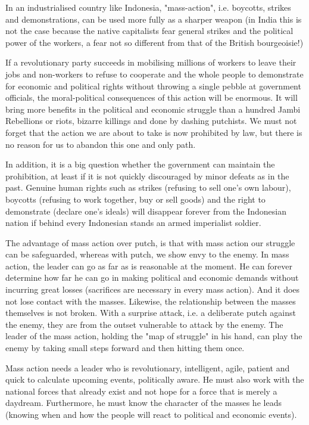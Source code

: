 In an industrialised country like Indonesia, "mass-action", i.e. boycotts, strikes and demonstrations, can be used more fully as a 
sharper weapon (in India this is not the case because the native capitalists fear general strikes and the political power of the workers, 
a fear not so different from that of the British bourgeoisie!)\nline

If a revolutionary party succeeds in mobilising millions of workers to leave their jobs and non-workers to refuse to cooperate and the 
whole people to demonstrate for economic and political rights without throwing a single pebble at government officials, the moral-political 
consequences of this action will be enormous. It will bring more benefits in the political and economic struggle than a hundred Jambi 
Rebellions or riots, bizarre killings and done by dashing putchists. We must not forget that the action we are about to take is now 
prohibited by law, but there is no reason for us to abandon this one and only path.\nline

In addition, it is a big question whether the government can maintain the prohibition, at least if it is not quickly discouraged by minor 
defeats as in the past. Genuine human rights such as strikes (refusing to sell one's own labour), boycotts (refusing to work together, 
buy or sell goods) and the right to demonstrate (declare one's ideals) will disappear forever from the Indonesian nation if behind every 
Indonesian stands an armed imperialist soldier.\nline

The advantage of mass action over putch, is that with mass action our struggle can be safeguarded, whereas with putch, 
we show envy to the enemy. In mass action, the leader can go as far as is reasonable at the moment. He can forever determine how far he 
can go in making political and economic demands without incurring great losses (sacrifices are necessary in every mass action). And it 
does not lose contact with the masses. Likewise, the relationship between the masses themselves is not broken. With a surprise attack, 
i.e. a deliberate putch against the enemy, they are from the outset vulnerable to attack by the enemy. The leader of the mass action, 
holding the "map of struggle" in his hand, can play the enemy by taking small steps forward and then hitting them once.\nline

Mass action needs a leader who is revolutionary, intelligent, agile, patient and quick to calculate upcoming events, 
politically aware. He must also work with the national forces that already exist and not hope for a force that is merely a daydream. 
Furthermore, he must know the character of the masses he leads (knowing when and how the people will react to political and economic events).\nline


